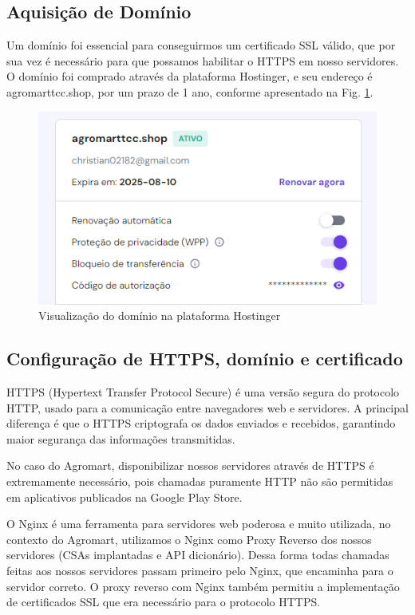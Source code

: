 \subsection{Aquisição de Domínio}
Um domínio foi essencial para conseguirmos um certificado SSL válido, que por sua vez é necessário para que possamos habilitar o HTTPS em nosso servidores. O domínio foi comprado através da plataforma Hostinger, e seu endereço é agromarttcc.shop, por um prazo de 1 ano, conforme apresentado na Fig. \ref{dominio}. 

\begin{figure}[h]
	\centering
	\includegraphics[keepaspectratio=true,scale=0.35]{figuras/dominio.png}
	\caption{Visualização do domínio na plataforma Hostinger}
	\label{dominio}
\end{figure}

\subsection{Configuração de HTTPS, domínio e certificado}
HTTPS (Hypertext Transfer Protocol Secure) é uma versão segura do protocolo HTTP, usado para a comunicação entre navegadores web e servidores. A principal diferença é que o HTTPS criptografa os dados enviados e recebidos, garantindo maior segurança das informações transmitidas.

No caso do Agromart, disponibilizar nossos servidores através de HTTPS é extremamente necessário, pois chamadas puramente HTTP não são permitidas em aplicativos publicados na Google Play Store.

O Nginx é uma ferramenta para servidores web poderosa e muito utilizada, no contexto do Agromart, utilizamos o Nginx como Proxy Reverso dos nossos servidores (CSAs implantadas e API dicionário). Dessa forma todas chamadas feitas aos nossos servidores passam primeiro pelo Nginx, que encaminha para o servidor correto. O proxy reverso com Nginx também permitiu a implementação de certificados SSL que era necessário para o protocolo HTTPS.


